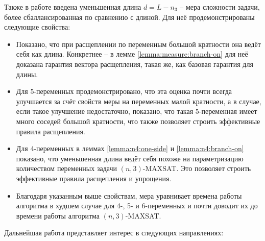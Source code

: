 Также в работе введена уменьшенная длина $d = L - n_3$ -- мера сложности задачи, более сбаллансированная по сравнению с длиной. Для неё продемонстрированы следующие свойства:
\begin{itemize}
 \item Показано, что при расщеплении по переменным большой кратности она ведёт себя как длина. Конкретнее -- в лемме \ref{lemma:measure:branch-on} для неё доказана гарантия вектора расщепления, такая же, как базовая гарантия для длины.
 \item Для 5-переменных продемонстрировано, что эта оценка почти всегда улучшается за счёт свойств меры на переменных малой кратности, а в случае, если такое улучшение недостаточно, показано, что такая 5-переменная имеет много соседей большой кратности, что также позволяет строить эффективные правила расщепления.
 \item Для 4-переменных в леммах \ref{lemma:n4:one-side} и \ref{lemma:n4:branch-on} показано, что уменьшенная длина ведёт себя похоже на параметризацию количеством переменных задачи $(n,3)$-MAXSAT. Это позволяет строить эффективные правила расщепления и упрощения.
 \item Благодаря указанным выше свойствам, мера уравнивает времена работы алгоритма в худшем случае для 4-, 5- и 6-переменных и почти доводит их до времени работы алгоритма $(n,3)$-MAXSAT.
\end{itemize}

Дальнейшая работа представляет интерес в следующих направлениях:

